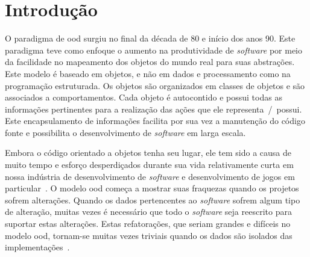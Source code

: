 \acresetall{}
\chapter{Introdução}
\label{cap:introducao}


O paradigma de \ac{ood} surgiu no final da década de 80 e início dos anos 90.
Este paradigma teve como enfoque o aumento na produtividade de \textit{software} por meio da facilidade  no mapeamento dos objetos do mundo real para suas abstrações.
Este modelo é baseado em objetos, e não em dados e processamento como na programação estruturada.
Os objetos são organizados em classes de objetos e são associados a comportamentos.
Cada objeto é autocontido e possui todas as informações pertinentes para a realização das ações que ele representa~/~possui.
Este encapsulamento de informações facilita por sua vez a manutenção do código fonte e possibilita o desenvolvimento de \textit{software} em larga escala.


Embora o código orientado a objetos tenha seu lugar, ele tem sido a causa de muito tempo e esforço desperdiçados durante sua vida relativamente curta em nossa indústria de desenvolvimento de \textit{software} e desenvolvimento de jogos em particular~\cite{fabian2013data}.
O modelo \ac{ood} começa a mostrar suas fraquezas quando os projetos sofrem alterações.
Quando os dados pertencentes ao \textit{software} sofrem algum tipo de alteração, muitas vezes é necessário que todo o \textit{software} seja reescrito para suportar estas alterações.
Estas refatorações, que seriam grandes e difíceis no modelo \ac{ood}, tornam-se muitas vezes triviais quando os dados são isolados das implementações~\cite{fabian2013data}.


